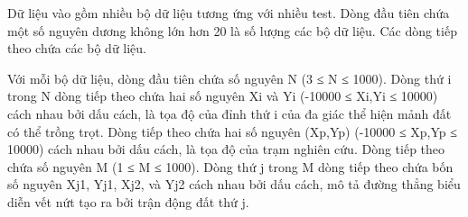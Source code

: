 Dữ liệu vào gồm nhiều bộ dữ liệu tương ứng với nhiều test. Dòng đầu tiên chứa một số nguyên dương không lớn hơn 20 là số lượng các bộ dữ liệu. Các dòng tiếp theo chứa các bộ dữ liệu.  

   Với mỗi bộ dữ liệu, dòng đầu tiên chứa số nguyên N (3 ≤  N ≤  1000). Dòng thứ i trong N dòng tiếp theo chứa hai số nguyên Xi và Yi (-10000 ≤ Xi,Yi ≤ 10000) cách nhau bởi dấu cách, là tọa độ của đỉnh thứ i của đa giác thể hiện mảnh đất có thể trồng trọt. Dòng tiếp theo chứa hai số nguyên (Xp,Yp) (-10000 ≤ Xp,Yp ≤ 10000) cách nhau bởi dấu cách, là tọa độ của trạm nghiên cứu. Dòng tiếp theo chứa số nguyên M (1 ≤ M ≤ 1000). Dòng thứ j trong M dòng tiếp theo chứa bốn số nguyên Xj1, Yj1, Xj2, và Yj2 cách nhau bởi dấu cách, mô tả đường thẳng biểu diễn vết nứt tạo ra bởi trận động đất thứ j.  

\